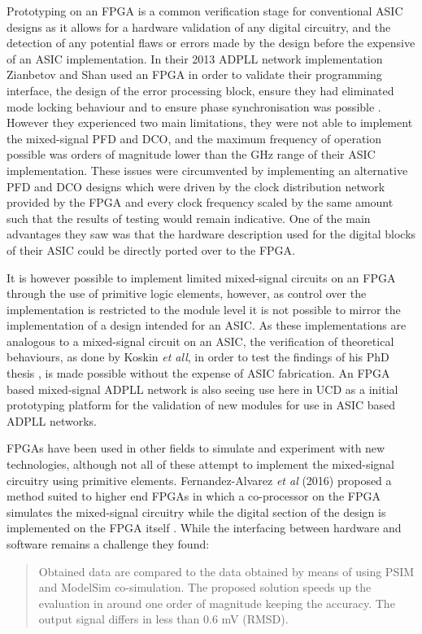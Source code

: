 Prototyping on an \ac{FPGA} is a common verification stage for conventional \ac{ASIC} designs as it allows for a hardware validation of any digital circuitry, and the detection of any potential flaws or errors made by the design before the expensive of an \ac{ASIC} implementation. In their 2013 \ac{ADPLL} network implementation Zianbetov and Shan used an \ac{FPGA} in order to validate their programming interface, the design of the error processing block, ensure they had eliminated mode locking behaviour and to ensure phase synchronisation was possible \cite{zianbetov2013phd,shan2014phd}. However they experienced two main limitations, they were not able to implement the mixed-signal \ac{PFD} and \ac{DCO}, and the maximum frequency of operation possible was orders of magnitude lower than the GHz range of their \ac{ASIC} implementation. These issues were circumvented by implementing an alternative \ac{PFD} and \ac{DCO} designs which were driven by the clock distribution network provided by the \ac{FPGA} and every clock frequency scaled by the same amount such that the results of testing would remain indicative. One of the main advantages they saw was that the hardware description used for the digital blocks of their \ac{ASIC} could be directly ported over to the \ac{FPGA}.

It is however possible to implement limited mixed-signal circuits on an \ac{FPGA} through the use of primitive logic elements, however, as control over the implementation is restricted to the module level it is not possible to mirror the implementation of a design intended for an \ac{ASIC}. As these implementations are analogous to a mixed-signal circuit on an \ac{ASIC}, the verification of theoretical behaviours, as done by Koskin \textit{et all}, in order to test the findings of his PhD thesis \cite{theboys2019}, is made possible without the expense of \ac{ASIC} fabrication. An \ac{FPGA} based mixed-signal \ac{ADPLL} network is also seeing use here in \ac{UCD} as a initial prototyping platform for the validation of new modules for use in \ac{ASIC} based \ac{ADPLL} networks.

\ac{FPGA}s have been used in other fields to simulate and experiment with new technologies, although not all of these attempt to implement the mixed-signal circuitry using primitive elements. Fernandez-Alvarez \textit{et al} (2016) proposed a method suited to higher end \ac{FPGA}s in which a co-processor on the \ac{FPGA} simulates the mixed-signal circuitry while the digital section of the design is implemented on the \ac{FPGA} itself \cite{fernandez2017hw}. While the interfacing between hardware and software remains a challenge they found:
\begin{quotation}
	Obtained data are compared to the data obtained by means of using PSIM and ModelSim co-simulation. The proposed solution speeds up the evaluation in around one order of magnitude keeping the accuracy. The output signal differs in less than 0.6 mV (RMSD).
\end{quotation}

